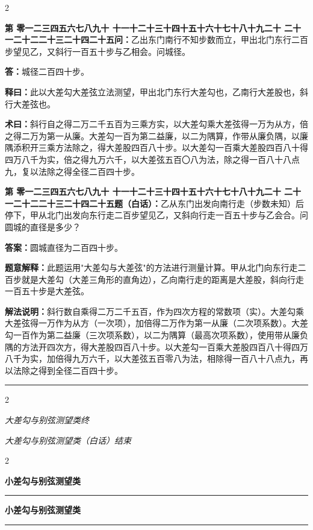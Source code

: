\documentclass[10pt,a4paper]{article}
\newcommand{\longline}{\noindent\rule{\textwidth}{0.4pt}}
\newcounter{probnum}
\newcounter{probnumvol}[section]
\newcommand{\chnum}[1]{%
  \ifcase#1 零\or 一\or 二\or 三\or 四\or 五\or 六\or 七\or 八\or 九\or 十\or
    十一\or 十二\or 十三\or 十四\or 十五\or 十六\or 十七\or 十八\or 十九\or 二十\or
    二十一\or 二十二\or 二十三\or 二十四\or 二十五\fi}
\newcommand{\problemclassical}[1]{%
  \stepcounter{probnumvol}%
  \par\noindent
  \textcolor{classicalcolor}{\textbf{第\chnum{\value{probnumvol}}问：}}#1\par\smallskip
}
\newcommand{\problemmodern}[1]{%
  \par\noindent
  \textcolor{moderncolor}{\textbf{第\chnum{\value{probnumvol}}题（白话）：}}#1\par\smallskip
}
\newcommand{\answerclassical}[1]{%
  \par\noindent\textcolor{classicalcolor}{\textbf{答：}}#1\par
}
\newcommand{\answermodern}[1]{%
  \par\noindent\textcolor{moderncolor}{\textbf{答案：}}#1\par
}
\newcommand{\shiyiclassical}[1]{%
  \par\noindent\textcolor{classicalcolor}{\textbf{释曰：}}#1\par
}
\newcommand{\shiyimodern}[1]{%
  \par\noindent\textcolor{moderncolor}{\textbf{题意解释：}}#1\par
}
\newcommand{\shuyueclassical}[1]{%
  \par\noindent\textcolor{classicalcolor}{\textbf{术曰：}}#1\par
}
\newcommand{\shuyuemodern}[1]{%
  \par\noindent\textcolor{moderncolor}{\textbf{解法说明：}}#1\par
}
\newcommand{\volheaderclassical}[1]{%
  \begin{center}{\large\bfseries\color{volcolor} #1}\end{center}
  \vspace{0.3cm}
  \longline
  \vspace{0.3cm}
}
\newcommand{\volheadermodern}[1]{%
  \begin{center}{\large\bfseries\color{volcolor} #1}\end{center}
  \vspace{0.3cm}
  \longline
  \vspace{0.3cm}
}
\newcommand{\endclassical}[1]{%
  \vspace{0.3cm}
  \begin{center}\textit{#1}\end{center}
}
\newcommand{\endmodern}[1]{%
  \vspace{0.3cm}
  \begin{center}\textit{#1}\end{center}
}
\begin{document}
\begin{paracol}{2}

\problemclassical{乙出东门南行不知步数而立，甲出北门东行二百步望见乙，又斜行一百五十步与乙相会。问城径。}

\answerclassical{城径二百四十步。}

\shiyiclassical{此以大差勾大差弦立法测望，甲出北门东行大差勾也，乙南行大差股也，斜行大差弦也。}

\shuyueclassical{斜行自之得二万二千五百为三乘方实，以大差勾乘大差弦得一万为从方，倍之得二万为第一从廉。大差勾一百为第二益廉，以二为隅算，作带从廉负隅，以廉隅添积开三乘方法除之，得大差股四百八十步。以大差勾一百乘大差股四百八十得四万八千为实，倍之得九万六千，以大差弦五百〇八为法，除之得一百八十八点九，复以法除之得全径二百四十步。}

\switchcolumn

\problemmodern{乙从东门出发向南行走（步数未知）后停下，甲从北门出发向东行走二百步望见乙，又斜向行走一百五十步与乙会合。问圆城的直径是多少？}

\answermodern{圆城直径为二百四十步。}

\shiyimodern{此题运用"大差勾与大差弦"的方法进行测量计算。甲从北门向东行走二百步就是大差勾（大差三角形的直角边），乙向南行走的距离是大差股，斜向行走一百五十步是大差弦。}

\shuyuemodern{斜行数自乘得二万二千五百，作为四次方程的常数项（实）。大差勾乘大差弦得一万作为从方（一次项），加倍得二万作为第一从廉（二次项系数）。大差勾一百作为第二益廉（三次项系数），以二为隅算（最高次项系数），使用带从廉负隅的方法开四次方，得大差股四百八十步。以大差勾一百乘大差股四百八十得四万八千为实，加倍得九万六千，以大差弦五百零八为法，相除得一百八十八点九，再以法除之得到全径二百四十步。}

\end{paracol}

\vspace{0.5cm}
\longline
\begin{paracol}{2}
\endclassical{大差勾与别弦测望类终}
\switchcolumn
\endmodern{大差勾与别弦测望类（白话）结束}
\end{paracol}

\newpage

\setcounter{probnumvol}{0}

\begin{paracol}{2}

\volheaderclassical{小差勾与别弦测望类}

\switchcolumn

\volheadermodern{小差勾与别弦测望类}

\end{paracol}
\end{document}
